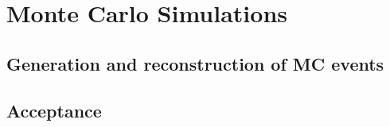 \chapter{Monte Carlo Simulations}

\section{Generation and reconstruction of MC events}

\section{Acceptance}